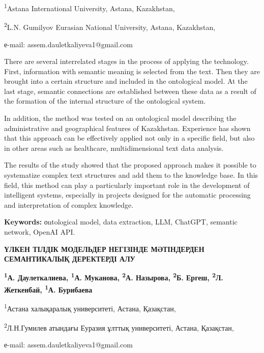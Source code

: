 \begin{affiliation}
\textsuperscript{1}Astana International University, Astana, Kazakhstan,

\textsuperscript{2}L.N. Gumilyov Eurasian National University, Astana, Kazakhstan,

е-mail: assem.dauletkaliyeva1@gmail.com
\end{affiliation}

There are several interrelated stages in the process of applying the
technology. First, information with semantic meaning is selected from
the text. Then they are brought into a certain structure and included in
the ontological model. At the last stage, semantic connections are
established between these data as a result of the formation of the
internal structure of the ontological system.

In addition, the method was tested on an ontological model describing
the administrative and geographical features of Kazakhstan. Experience
has shown that this approach can be effectively applied not only in a
specific field, but also in other areas such as healthcare,
multidimensional text data analysis.

The results of the study showed that the proposed approach makes it
possible to systematize complex text structures and add them to the
knowledge base. In this field, this method can play a particularly
important role in the development of intelligent systems, especially in
projects designed for the automatic processing and interpretation of
complex knowledge.

{\bfseries Keywords:} оntological model, data extraction, LLM, ChatGPT,
semantic network, OpenAI API.

\begin{articleheader}
{\bfseries ҮЛКЕН ТІЛДІК МОДЕЛЬДЕР НЕГІЗІНДЕ МӘТІНДЕРДЕН СЕМАНТИКАЛЫҚ ДЕРЕКТЕРДІ АЛУ}

{\bfseries
\textsuperscript{1}А. Даулеткалиева\textsuperscript{\envelope },
\textsuperscript{1}А. Муканова,
\textsuperscript{2}А. Назырова,
\textsuperscript{2}Б. Ергеш,
\textsuperscript{2}Л. Жеткенбай,
\textsuperscript{1}А. Бурибаева
}
\end{articleheader}

\begin{affiliation}
\textsuperscript{1}Астана халықаралық университеті, Астана, Қазақстан,

\textsuperscript{2}Л.Н.Гумилев атындағы Еуразия ұлттық университеті, Астана, Қазақстан,

е-mail: assem.dauletkaliyeva1@gmail.com
\end{affiliation}

